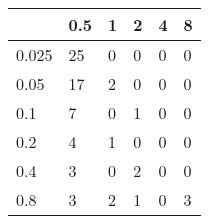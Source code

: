\begin{tabular}{|l|l|l|l|l|l|}
\toprule
\diagbox{$\eta$}{$\sigma$} & 0.5 & 1 & 2 & 4 & 8 \\
\midrule
0.025 & 25  & 0 & 0 & 0 & 0 \\ \midrule
0.05  & 17  & 2 & 0 & 0 & 0 \\ \midrule
0.1   & 7   & 0 & 1 & 0 & 0 \\ \midrule
0.2   & 4   & 1 & 0 & 0 & 0 \\ \midrule
0.4   & 3   & 0 & 2 & 0 & 0 \\ \midrule
0.8   & 3   & 2 & 1 & 0 & 3 \\
\bottomrule
\end{tabular}